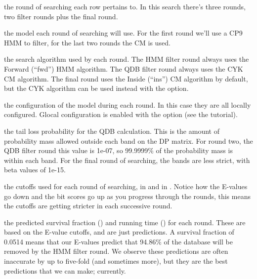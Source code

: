 \begin{wideitem}
\item[\emprog{rnd}] the round of searching each row pertains
  to. In this search there's three rounds, two filter rounds plus
  the final round. 

\item[\emprog{mod}] the model each round of searching will use. For
  the first round we'll use a CP9 HMM to filter, for the last two rounds the CM is
  used.

\item[\emprog{alg}] the search algorithm used by each round. 
  The HMM filter round always uses the Forward (``fwd'') HMM algorithm. 
  The QDB filter round always uses the CYK CM algorithm. The final
  round uses the Inside (``ins'') CM algorithm by default, but the 
  CYK algorithm can be used instead with the  option. 

\item[\emprog{cfg}] the configuration of the model during each
  round. In this case they are all locally configured. Glocal
  configuration is enabled with the  option (see the tutorial).

\item[\emprog{beta}] the tail loss probability for the QDB
  calculation. This is the amount of probability mass allowed outside
  each band on the DP matrix. For round two, the QDB filter round this
  value is 1e-07, so 99.9999\% of the probability mass is within each
  band. For the final round of searching, the bands are less strict,
  with beta values of 1e-15.

\item[\emprog{cutoffs}] the cutoffs used for each round of searching,
  in  and in . Notice how the E-values go
  down and the bit scores go up as you progress through the rounds,
  this means the cutoffs are getting stricter in each successive
  round. 

\item[\emprog{predictions}] the predicted survival fraction
  () and running time () for each
  round. These are based on the E-value cutoffs, and are just
  predictions. A survival fraction of 0.0514 means that our E-values
  predict that 94.86\% of the database will be removed by the HMM
  filter round. We observe these predictions are often inaccurate by up
  to five-fold (and sometimes more), but they are the best predictions
  that we can make; currently.
\end{wideitem}

